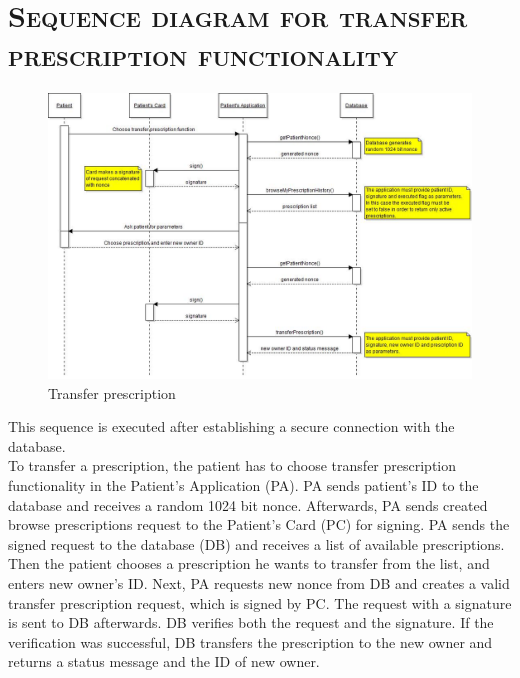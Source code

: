 \FloatBarrier

\newpage
\section{\textsc{Sequence diagram for transfer prescription functionality}}
\begin{figure}[!h]
\includegraphics[width=\linewidth]{patient/transferPrescriptionSequenceDiagram}
\caption{Transfer prescription}
\end{figure}
This sequence is executed after establishing a secure connection with the database.\\

To transfer a prescription, the patient has to choose transfer prescription functionality in the Patient’s Application (PA). 
PA sends patient’s ID to the database and receives a random 1024 bit nonce. 
Afterwards, PA sends created browse prescriptions request to the Patient’s Card (PC) for signing. 
PA sends the signed request to the database (DB) and receives a list of available prescriptions. 
Then the patient chooses a prescription he wants to transfer from the list, and enters new owner’s ID.
Next, PA requests new nonce from DB and creates a valid transfer prescription request, which is signed by PC. 
The request with a signature is sent to DB afterwards. 
DB verifies both the request and the signature. If the verification was successful, DB transfers the prescription to the new owner and returns a status message and the ID of new owner.
\FloatBarrier

\newpage
